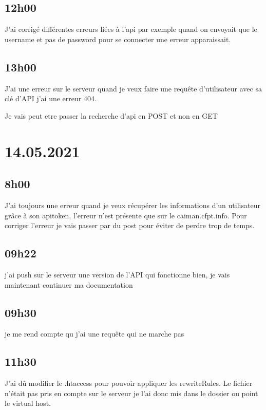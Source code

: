 \documentclass[a4paper,12pt,french]{sphinxmanual}
\begin{document}
\subsection{12h00}
\label{\detokenize{logbook:id111}}
\sphinxAtStartPar
J’ai corrigé différentes erreurs liées à l’api par exemple quand on envoyait que le username et pas de password pour se connecter une erreur apparaissait.


\subsection{13h00}
\label{\detokenize{logbook:id112}}
\sphinxAtStartPar
J’ai une erreur sur le serveur quand je veux faire une requête d’utilisateur avec sa clé d’API j’ai une erreur 404.

\sphinxAtStartPar
Je vais peut etre passer la recherche d’api en POST et non en GET


\section{14.05.2021}
\label{\detokenize{logbook:id113}}

\subsection{8h00}
\label{\detokenize{logbook:id114}}
\sphinxAtStartPar
J’ai toujours une erreur quand je veux récupérer les informations d’un utilisateur grâce à son apitoken, l’erreur n’est présente que sur le caiman.cfpt.info.
Pour corriger l’erreur je vais passer par du post pour éviter de perdre trop de temps.


\subsection{09h22}
\label{\detokenize{logbook:h22}}
\sphinxAtStartPar
j’ai push sur le serveur une version de l’API qui fonctionne bien, je vais maintenant continuer ma documentation


\subsection{09h30}
\label{\detokenize{logbook:id115}}
\sphinxAtStartPar
je me rend compte qu j’ai une requête qui ne marche pas


\subsection{11h30}
\label{\detokenize{logbook:id116}}
\sphinxAtStartPar
J’ai dû modifier le .htaccess pour pouvoir appliquer les rewriteRules. Le fichier n’était pas pris en compte sur le serveur je l’ai donc mis dans le dossier ou point le virtual host.
\end{document}

